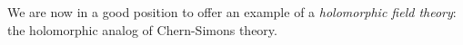 \documentclass[11pt]{amsart}
\def\del{\partial}
\begin{document}
We are now in a good position to offer an example of a {\em holomorphic field theory}:
the holomorphic analog of Chern-Simons theory.
 
%
\end{document}
